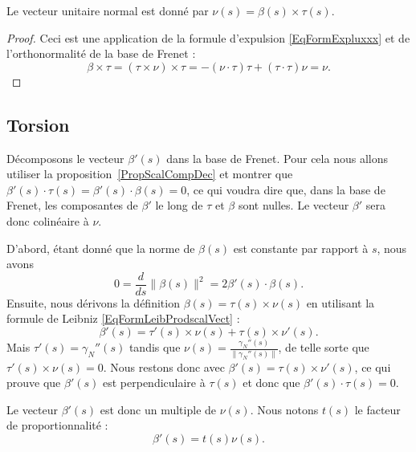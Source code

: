 \begin{lemma}
	Le  vecteur unitaire normal est donné par \( \nu(s)=\beta(s)\times \tau(s)\).
\end{lemma}

\begin{proof}
	Ceci est une application de la formule d'expulsion \eqref{EqFormExpluxxx} et de l'orthonormalité de la base de Frenet :
	\begin{equation}
		\beta\times\tau=(\tau\times\nu)\times\tau=-(\nu\cdot\tau)\tau+(\tau\cdot\tau)\nu=\nu.
	\end{equation}
\end{proof}

\subsection{Torsion}

Décomposons le vecteur \( \beta'(s)\) dans la base de Frenet. Pour cela nous allons utiliser la proposition~\ref{PropScalCompDec} et montrer que \( \beta'(s)\cdot \tau(s)=\beta'(s)\cdot\beta(s)=0\), ce qui voudra dire que, dans la base de Frenet, les composantes de \( \beta'\) le long de \( \tau\) et \( \beta\) sont nulles. Le vecteur \( \beta'\) sera donc colinéaire à \( \nu\).

D'abord, étant donné que la norme de \( \beta(s)\) est constante par rapport à \( s\), nous avons
\begin{equation}
	0=\frac{ d }{ ds }\| \beta(s) \|^2=2\beta'(s)\cdot\beta(s).
\end{equation}
Ensuite, nous dérivons la définition \( \beta(s)=\tau(s)\times\nu(s)\) en utilisant la formule de Leibniz \eqref{EqFormLeibProdscalVect} :
\begin{equation}
	\beta'(s)=\tau'(s)\times\nu(s)+\tau(s)\times\nu'(s).
\end{equation}
Mais \( \tau'(s)=\gamma_N''(s)\) tandis que \( \nu(s)=\frac{ \gamma_N''(s) }{ \| \gamma_N''(s) \| }\), de telle sorte que \( \tau'(s)\times\nu(s)=0\). Nous restons donc avec \( \beta'(s)=\tau(s)\times\nu'(s)\), ce qui prouve que \( \beta'(s)\) est perpendiculaire à \( \tau(s)\) et donc que \( \beta'(s)\cdot\tau(s)=0\).

Le vecteur \( \beta'(s)\) est donc un multiple de \( \nu(s)\). Nous notons \( t(s)\) le facteur de proportionnalité :
\begin{equation}
	\beta'(s)=t(s)\nu(s).
\end{equation}

